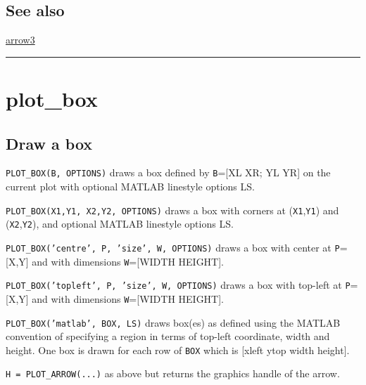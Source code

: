 \subsection*{See also}


\hyperlink{arrow3}{\color{blue} arrow3}

\vspace{1.5ex}\rule{\textwidth}{1mm}

\hypertarget{plot\_box}{\section*{plot\_box}}
\subsection*{Draw a box}


\texttt{PLOT\_BOX(B, OPTIONS)} draws a box defined by \texttt{B}=[XL XR; YL YR] on the current
plot with optional MATLAB linestyle options LS.



\texttt{PLOT\_BOX(X1,Y1, X2,Y2, OPTIONS)} draws a box with corners at (\texttt{X1},\texttt{Y1}) and (\texttt{X2},\texttt{Y2}),
and optional MATLAB linestyle options LS.



\texttt{PLOT\_BOX('centre', P, 'size', W, OPTIONS)} draws a box with center at \texttt{P}=[X,Y] and
with dimensions \texttt{W}=[WIDTH HEIGHT].



\texttt{PLOT\_BOX('topleft', P, 'size', W, OPTIONS)} draws a box with top-left at \texttt{P}=[X,Y]
and with dimensions \texttt{W}=[WIDTH HEIGHT].



\texttt{PLOT\_BOX('matlab', BOX, LS)} draws box(es) as defined using the MATLAB convention of
specifying a region in terms of top-left coordinate, width and height.  One box is
drawn for each row of \texttt{BOX} which is [xleft ytop width height].



\texttt{H = PLOT\_ARROW(...)} as above but returns the graphics handle of the arrow.


